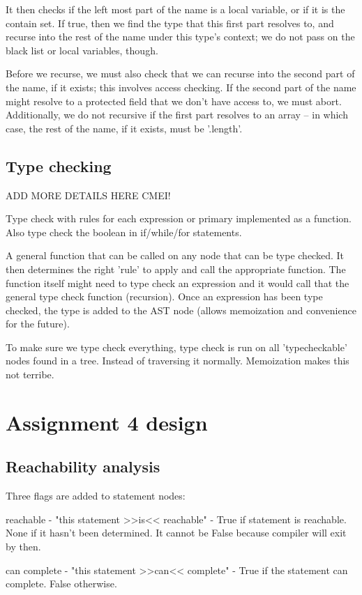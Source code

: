 \documentclass[12pt]{article}
\begin{document}
It then checks if the left most part of the name is a local variable, or if it
is the contain set.  If true, then we find the type that this first part
resolves to, and recurse into the rest of the name under this type's context;
we do not pass on the black list or local variables, though.

Before we recurse, we must also check that we can recurse into the second part
of the name, if it exists; this involves access checking.  If the second part of
the name might resolve to a protected field that we don't have access to, we
must abort.  Additionally, we do not recursive if the first part resolves to an
array -- in which case, the rest of the name, if it exists, must be '.length'.

\subsection{Type checking}
ADD MORE DETAILS HERE CMEI!

Type check with rules for each expression or primary implemented as a function.
Also type check the boolean in if/while/for statements.

A general function that can be called on any node that can be type checked.
It then determines the right 'rule' to apply and call the appropriate function.
The function itself might need to type check an expression and it would
call that the general type check function (recursion). Once an expression has been
type checked, the type is added to the AST node (allows memoization and convenience
for the future).

To make sure we type check everything, type check is run on all 'typecheckable'
nodes found in a tree. Instead of traversing it normally. Memoization makes this
not terribe.

\section{Assignment 4 design}

\subsection{Reachability analysis}
Three flags are added to statement nodes:

reachable - "this statement >>is<< reachable" -
    True if statement is reachable. None if it hasn't been determined.
    It cannot be False because compiler will exit by then.

can complete - "this statement >>can<< complete" -
    True if the statement can complete. False otherwise.
\end{document}
